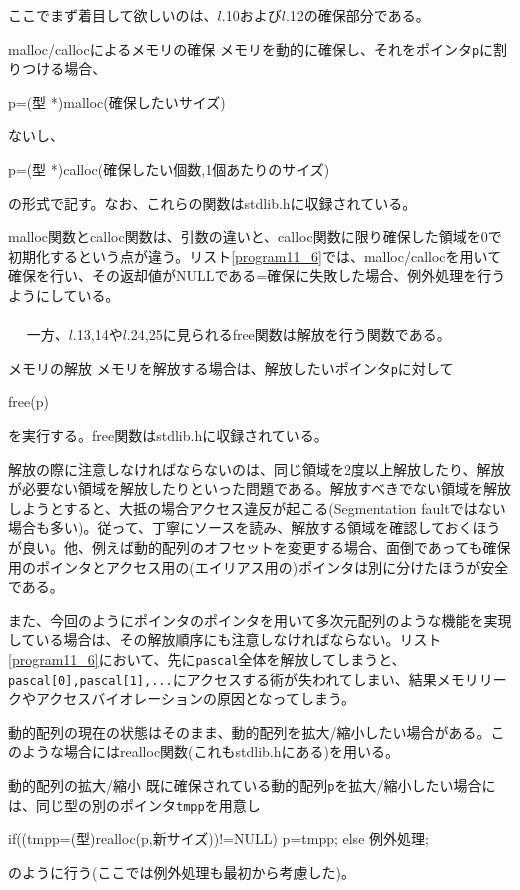 ここでまず着目して欲しいのは、$l$.10および$l$.12の確保部分である。
\begin{itembox}[l]{malloc/callocによるメモリの確保}
メモリを動的に確保し、それをポインタ\verb|p|に割りつける場合、
\begin{code}
p=(型 *)malloc(確保したいサイズ)
\end{code}
ないし、
\begin{code}
p=(型 *)calloc(確保したい個数,1個あたりのサイズ)
\end{code}
の形式で記す。なお、これらの関数はstdlib.hに収録されている。
\end{itembox}
malloc関数とcalloc関数は、引数の違いと、calloc関数に限り確保した領域を0で初期化するという点が違う。リスト\ref{program11_6}では、malloc/callocを用いて確保を行い、その返却値がNULLである=確保に失敗した場合、例外処理を行うようにしている。
\\ \\　
一方、$l$.13,14や$l$.24,25に見られるfree関数は解放を行う関数である。
\begin{itembox}[l]{メモリの解放}
メモリを解放する場合は、解放したいポインタ\verb|p|に対して
\begin{code}
free(p)
\end{code}
を実行する。free関数はstdlib.hに収録されている。
\end{itembox}
解放の際に注意しなければならないのは、同じ領域を2度以上解放したり、解放が必要ない領域を解放したりといった問題である。解放すべきでない領域を解放しようとすると、大抵の場合アクセス違反が起こる(Segmentation faultではない場合も多い)。従って、丁寧にソースを読み、解放する領域を確認しておくほうが良い。他、例えば動的配列のオフセットを変更する場合、面倒であっても確保用のポインタとアクセス用の(エイリアス用の)ポインタは別に分けたほうが安全である。

また、今回のようにポインタのポインタを用いて多次元配列のような機能を実現している場合は、その解放順序にも注意しなければならない。リスト\ref{program11_6}において、先に\verb|pascal|全体を解放してしまうと、\verb|pascal[0],pascal[1],...|にアクセスする術が失われてしまい、結果メモリリークやアクセスバイオレーションの原因となってしまう。

動的配列の現在の状態はそのまま、動的配列を拡大/縮小したい場合がある。このような場合にはrealloc関数(これもstdlib.hにある)を用いる。
\begin{itembox}[l]{動的配列の拡大/縮小}
既に確保されている動的配列\verb|p|を拡大/縮小したい場合には、同じ型の別のポインタ\verb|tmpp|を用意し
\begin{code}
if((tmpp=(型)realloc(p,新サイズ))!=NULL) p=tmpp;
else 例外処理;
\end{code}
のように行う(ここでは例外処理も最初から考慮した)。
\end{itembox}


